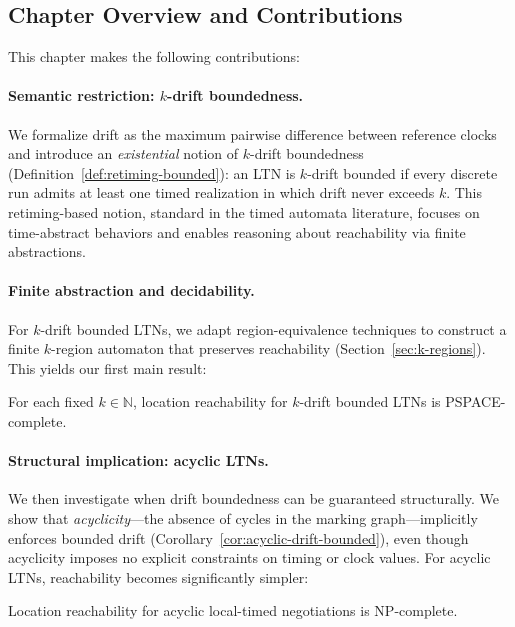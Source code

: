 \subsection*{Chapter Overview and Contributions}

This chapter makes the following contributions:

\paragraph{Semantic restriction: $k$-drift boundedness.} We formalize drift as the maximum pairwise difference between reference clocks and introduce an \emph{existential} notion of $k$-drift boundedness (Definition~\ref{def:retiming-bounded}): an LTN is $k$-drift bounded if every discrete run admits at least one timed realization in which drift never exceeds $k$. This retiming-based notion, standard in the timed automata literature, focuses on time-abstract behaviors and enables reasoning about reachability via finite abstractions.

\paragraph{Finite abstraction and decidability.} For $k$-drift bounded LTNs, we adapt region-equivalence techniques to construct a finite $k$-region automaton that preserves reachability (Section~\ref{sec:k-regions}). This yields our first main result:

\begin{theorem}
\label{thm:drift-main-result}
For each fixed $k \in \mathbb{N}$, location reachability for $k$-drift bounded LTNs is PSPACE-complete.
\end{theorem}

\paragraph{Structural implication: acyclic LTNs.} We then investigate when drift boundedness can be guaranteed structurally. We show that \emph{acyclicity}—the absence of cycles in the marking graph—implicitly enforces bounded drift (Corollary~\ref{cor:acyclic-drift-bounded}), even though acyclicity imposes no explicit constraints on timing or clock values. For acyclic LTNs, reachability becomes significantly simpler:

\begin{theorem}
\label{thm:acyclic-np-complete}
Location reachability for acyclic local-timed negotiations is NP-complete.
\end{theorem}

